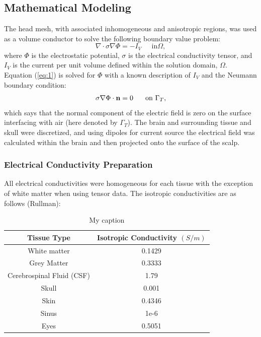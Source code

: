 \subsection{Mathematical Modeling}
\label{sec:math}


The head mesh, with associated inhomogeneous and anisotropic regions, was used as a volume conductor to solve the following boundary value problem:
%
\begin{equation}
\label{eq:1} \nabla\cdot\sigma\nabla\Phi = -I_{V} \;\;\;\;\mbox{ in
}\Omega,
\end{equation} 
%
where $\Phi$ is the electrostatic potential, $\sigma$ is the electrical conductivity tensor, and $I_{V}$ is the current per unit volume defined within the solution domain, $\Omega$. Equation (\ref{eq:1}) is solved for $\Phi$ with a known description of $I_{V}$ and the Neumann boundary condition:
%
\begin{equation} \sigma\nabla\Phi\cdot{\bf
n} = 0\;\;\;\;\;\mbox{ on }\Gamma_{T}, 
\end{equation} 
%
which says that the normal component of the electric field is zero on the surface interfacing with air (here denoted by $\Gamma_{T}$). The brain and surrounding tissue and skull were discretized, and using dipoles for current source the electrical field was calculated within the brain and then projected onto the surface of the scalp.

\subsubsection{Electrical Conductivity Preparation}
\label{sec:cond}

All electrical conductivities were homogeneous for each tissue with the exception of white matter when using tensor data. The isotropic conductivities are as follows (Rullman): 

\begin{table}[]
\centering
\caption{My caption}
\label{my-label}
\begin{tabular}{|c|c|}
\hline
Tissue Type               & Isotropic Conductivity $(S/m)$ \\ \hline
White matter              & 0.1429                         \\ \hline
Grey Matter               & 0.3333                         \\ \hline
Cerebrospinal Fluid (CSF) & 1.79                           \\ \hline
Skull                     & 0.001                          \\ \hline
Skin                      & 0.4346                         \\ \hline
Sinus                     & 1e-6                           \\ \hline
Eyes                      & 0.5051                         \\ \hline
\end{tabular}
\end{table}

